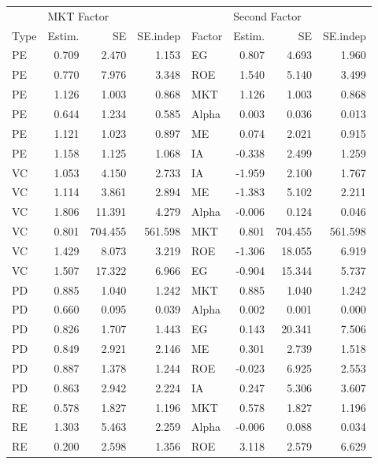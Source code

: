\documentclass[12pt]{article}
\begin{document}
\begin{table}[ht]
	\centering
	\begin{tabular}{lrrrlrrr}
		 & \multicolumn{3}{l}{MKT Factor} & & \multicolumn{3}{l}{Second Factor} \\ 
		Type & Estim. & SE & SE.indep & Factor & Estim. & SE & SE.indep \\ 
		\hline
		\hline
PE & 0.709 & 2.470 & 1.153 & EG & 0.807 & 4.693 & 1.960 \\ 
PE & 0.770 & 7.976 & 3.348 & ROE & 1.540 & 5.140 & 3.499 \\ 
PE & 1.126 & 1.003 & 0.868 & MKT & 1.126 & 1.003 & 0.868 \\ 
PE & 0.644 & 1.234 & 0.585 & Alpha & 0.003 & 0.036 & 0.013 \\ 
PE & 1.121 & 1.023 & 0.897 & ME & 0.074 & 2.021 & 0.915 \\ 
PE & 1.158 & 1.125 & 1.068 & IA & -0.338 & 2.499 & 1.259 \\
\hline 
VC & 1.053 & 4.150 & 2.733 & IA & -1.959 & 2.100 & 1.767 \\ 
VC & 1.114 & 3.861 & 2.894 & ME & -1.383 & 5.102 & 2.211 \\ 
VC & 1.806 & 11.391 & 4.279 & Alpha & -0.006 & 0.124 & 0.046 \\ 
VC & 0.801 & 704.455 & 561.598 & MKT & 0.801 & 704.455 & 561.598 \\ 
VC & 1.429 & 8.073 & 3.219 & ROE & -1.306 & 18.055 & 6.919 \\ 
VC & 1.507 & 17.322 & 6.966 & EG & -0.904 & 15.344 & 5.737 \\ 
\hline
PD & 0.885 & 1.040 & 1.242 & MKT & 0.885 & 1.040 & 1.242 \\ 
PD & 0.660 & 0.095 & 0.039 & Alpha & 0.002 & 0.001 & 0.000 \\ 
PD & 0.826 & 1.707 & 1.443 & EG & 0.143 & 20.341 & 7.506 \\ 
PD & 0.849 & 2.921 & 2.146 & ME & 0.301 & 2.739 & 1.518 \\ 
PD & 0.887 & 1.378 & 1.244 & ROE & -0.023 & 6.925 & 2.553 \\ 
PD & 0.863 & 2.942 & 2.224 & IA & 0.247 & 5.306 & 3.607 \\ 
\hline
RE & 0.578 & 1.827 & 1.196 & MKT & 0.578 & 1.827 & 1.196 \\ 
RE & 1.303 & 5.463 & 2.259 & Alpha & -0.006 & 0.088 & 0.034 \\ 
RE & 0.200 & 2.598 & 1.356 & ROE & 3.118 & 2.579 & 6.629 \\ 

\end{tabular}
\end{table}
\end{document}
